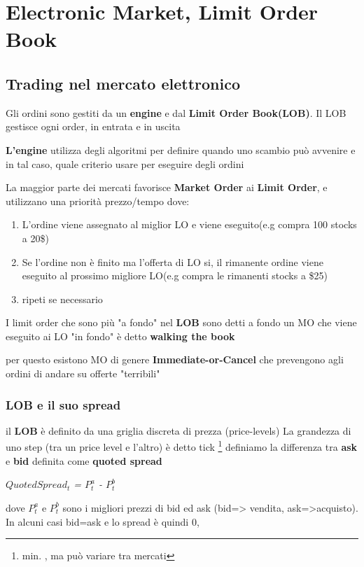 \documentclass[a4paper,11pt]{report}
\begin{document}
{%


\chapter{Electronic Market, Limit Order Book}

\section{Trading nel mercato elettronico}
	Gli ordini sono gestiti da un \textbf{engine} e dal \textbf{Limit Order Book(LOB)}. \newline
	Il LOB gestisce ogni order, in entrata e in uscita

	\textbf{L'engine} utilizza degli algoritmi per definire quando uno scambio può avvenire e in tal caso, quale criterio usare per 		eseguire degli ordini

	La maggior parte dei mercati favorisce \textbf{Market Order} ai \textbf{Limit Order}, e utilizzano una priorità prezzo/tempo dove:
\begin{enumerate}
	\item L'ordine viene assegnato al miglior LO e viene eseguito(e.g compra 100 stocks a 20\$)
	\item Se l'ordine non è finito ma l'offerta di LO si, il rimanente ordine viene eseguito al prossimo migliore LO(e.g compra le rimanenti stocks a \$25)
	\item ripeti se necessario
\end{enumerate}
	I limit order che sono più "a fondo" nel \textbf{LOB} sono detti a fondo \newline
	un MO che viene eseguito ai LO "in fondo" è detto \textbf{walking the book}

	per questo esistono MO di genere \textbf{Immediate-or-Cancel} che prevengono agli ordini di andare su offerte "terribili"
\subsection{LOB e il suo spread}
	il \textbf{LOB} è definito da una griglia discreta di prezza (price-levels) \newline
	La grandezza di uno step (tra un price level e l'altro) è detto tick \footnote{min. {}, ma può variare tra mercati} \newline
	definiamo la differenza tra \textbf{ask} e \textbf{bid} definita come \textbf{quoted spread}
\begin{center}
	\emph{$QuotedSpread_t$ = $P_t^a$ - $P_t^b$}
\end{center}
dove $P_t^a$ e $P_t^b$ sono i migliori prezzi di bid ed ask (bid=> vendita, ask=>acquisto).
	 \newline
	In alcuni casi bid=ask e lo spread è quindi 0,

}
\end{document}
